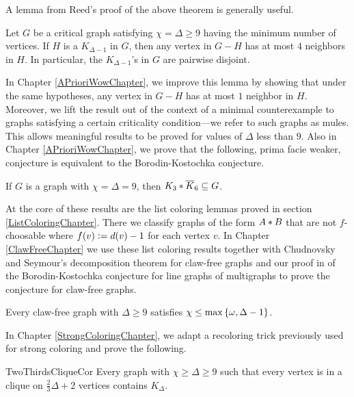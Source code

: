 A lemma from Reed's proof of the above theorem is generally useful.

\begin{lem}\label{ReedsLemma}
Let $G$ be a critical graph satisfying $\chi = \Delta \geq 9$ having the minimum number of vertices.  If $H$ is a $K_{\Delta - 1}$ in $G$, then any vertex in $G - H$ has at most $4$ neighbors in $H$.  In particular, the $K_{\Delta - 1}$'s in $G$ are pairwise disjoint.
\end{lem}

In Chapter \ref{APrioriWowChapter}, we improve this lemma by showing that under
the same hypotheses, any vertex in $G - H$ has at most $1$ neighbor in $H$.  Moreover, we lift the result out of the context of a minimal counterexample to graphs satisfying a certain criticality condition---we refer to such graphs as mules.  This allows meaningful results to be proved for values of $\Delta$ less than $9$.  Also in Chapter \ref{APrioriWowChapter}, we prove that the following, prima facie weaker, conjecture is equivalent to the Borodin-Kostochka conjecture.

\begin{conjecture} 
If $G$ is a graph with $\chi = \Delta = 9$, then $K_3 \mbox{\hspace{2 pt}$\ast$\hspace{2 pt}} \overline{K}_6
\subseteq G$.
\end{conjecture}

At the core of these results are the list coloring lemmas proved in section
\ref{ListColoringChapter}.  There we classify graphs of the form $A \mbox{\hspace{2 pt}$\ast$\hspace{2 pt}} B$
that are not $f$-choosable where $f(v) \mathrel{\mathop:}= d(v) - 1$ for each vertex
$v$.  In Chapter \ref{ClawFreeChapter} we use these list coloring results
together with Chudnovsky and Seymour's decomposition theorem for claw-free graphs \cite{chudnovsky2005structure} and our proof in \cite{rabern2011strengthening} of the Borodin-Kostochka conjecture for line graphs of multigraphs to prove the conjecture for claw-free graphs.

\begin{thm}
Every claw-free graph with $\Delta\geq 9$ satisfies $\chi \leq \max\left\{ \omega, \Delta - 1 \right\}$.
\end{thm}

In Chapter \ref{StrongColoringChapter}, we adapt a recoloring trick
previously used for strong coloring and prove the following.

\begin{repcor}{TwoThirdsCliqueCor}
Every graph with $\chi \geq \Delta \geq 9$ such that every
vertex is in a clique on $\frac23\Delta + 2$ vertices contains $K_\Delta$.
\end{repcor}

